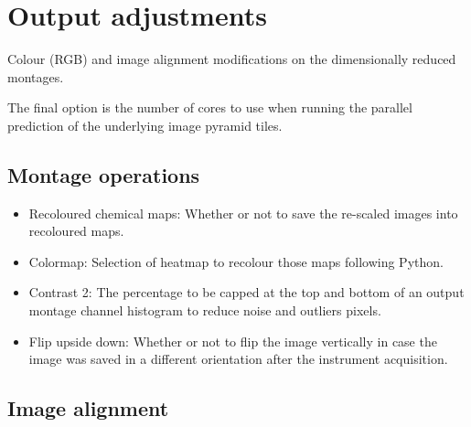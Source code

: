 	\section{Output adjustments}
	
	Colour (RGB) and image alignment modifications on the dimensionally reduced montages. 
	
	The final option is the number of cores to use when running the parallel prediction of the underlying image pyramid tiles.
	
	\subsection{Montage operations}
	
	\begin{itemize}
		
		\item Recoloured chemical maps: Whether or not to save the re-scaled images into recoloured maps.
		\item Colormap: Selection of heatmap to recolour those maps following Python.
		\item Contrast 2: The percentage to be capped at the top and bottom of an output montage channel histogram to reduce noise and outliers pixels.
		\item Flip upside down: Whether or not to flip the image vertically in case the image was saved in a different orientation after the instrument acquisition. 
		
	\end{itemize}
	
	\subsection{Image alignment}
	
